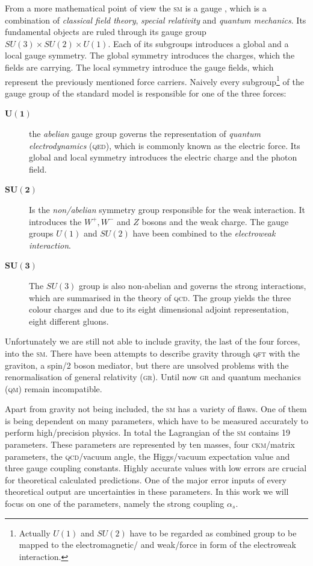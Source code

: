 \documentclass[../../index.tex]{subfiles}
\begin{document}
From a more mathematical point of view the \textsc{sm} is a gauge
, which is a combination of \textit{classical
  field theory}, \textit{special relativity} and \textit{quantum mechanics}. Its
fundamental objects are ruled through its gauge group \(SU(3)\times SU(2)\times
U(1)\). Each of its subgroups introduces a global and a local gauge symmetry.
The global symmetry introduces the charges, which the fields are carrying. The
local symmetry introduce the gauge fields, which represent the previously
mentioned force carriers. Naively every subgroup\footnote{Actually \(U(1)\) and
  \(SU(2)\) have to be regarded as combined group to be mapped to the
  electromagnetic\-/ and weak\-/force in form of the electroweak interaction.}
of the gauge group of the standard model is responsible for one of the three
forces:
\begin{description}
\item[\(\bm{U(1)}\)] the \textit{abelian} gauge group governs the representation
  of \textit{quantum electrodynamics} (\textsc{qed}), which is commonly known as
  the electric force. Its global and local symmetry introduces the electric
  charge and the photon field.
\item[\(\bm{SU(2)}\)] Is the \textit{non\-/abelian} symmetry group responsible
  for the weak interaction. It introduces the \(W^+,W^-\) and \(Z\) bosons and
  the weak charge. The gauge groups \(U(1)\) and \(SU(2)\) have been combined to
  the \textit{electroweak interaction}.
\item[\(\bm{SU(3)}\)] The \(SU(3)\) group is also non-abelian and governs the
  strong interactions, which are summarised in the theory of \textsc{qcd}. The
  group yields the three colour charges and due to its eight dimensional adjoint
  representation, eight different gluons.
\end{description}
Unfortunately we are still not able to include gravity, the last of the four
forces, into the \textsc{sm}. There have been attempts to describe gravity
through \textsc{qft} with the graviton, a spin\-/2 boson mediator, but there are
unsolved problems with the renormalisation of general relativity (\textsc{gr}).
Until now \textsc{gr} and quantum mechanics (\textsc{qm}) remain incompatible.

Apart from gravity not being included, the \textsc{sm} has a variety of flaws.
One of them is being dependent on many parameters, which have to be measured
accurately to perform high\-/precision physics. In total the Lagrangian of the
\textsc{sm} contains 19 parameters. These parameters are represented by ten
masses, four \textsc{ckm}\-/matrix parameters, the \textsc{qcd}\-/vacuum angle,
the Higgs\-/vacuum expectation value and three gauge coupling constants. Highly
accurate values with low errors are crucial for theoretical calculated
predictions. One of the major error inputs of every theoretical output are
uncertainties in these parameters. In this work we will focus on one of the
parameters, namely the strong coupling \(\alpha_s\).
\end{document}

